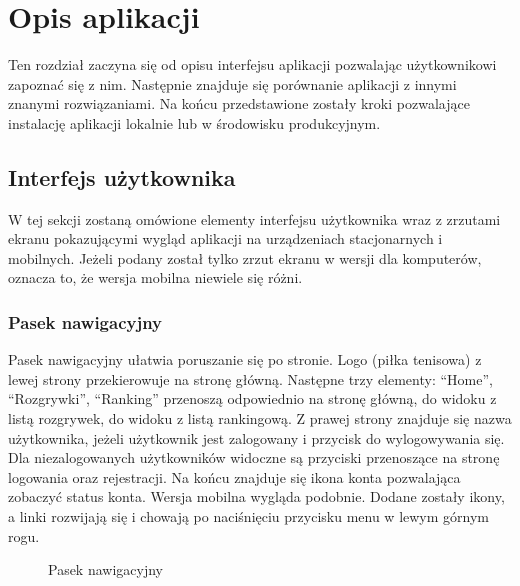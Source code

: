 \documentclass[shortabstract]{iithesis}
\begin{document}
\chapter{Opis aplikacji}
Ten rozdział zaczyna się od opisu interfejsu aplikacji pozwalając użytkownikowi zapoznać się z nim.
Następnie znajduje się porównanie aplikacji z innymi znanymi rozwiązaniami.
Na końcu przedstawione zostały kroki pozwalające instalację aplikacji lokalnie lub w środowisku produkcyjnym.
\section{Interfejs użytkownika}
W tej sekcji zostaną omówione elementy interfejsu użytkownika wraz z zrzutami ekranu pokazującymi wygląd aplikacji na urządzeniach stacjonarnych i mobilnych.
Jeżeli podany został tylko zrzut ekranu w wersji dla komputerów, oznacza to, że wersja mobilna niewiele się różni.
\subsection{Pasek nawigacyjny}
Pasek nawigacyjny ułatwia poruszanie się po stronie. Logo (piłka tenisowa) z lewej strony przekierowuje na stronę główną.
Następne trzy elementy: ``Home'', ``Rozgrywki'', ``Ranking'' przenoszą odpowiednio na stronę główną, do widoku z listą rozgrywek, do widoku z listą rankingową.
Z prawej strony znajduje się nazwa użytkownika, jeżeli użytkownik jest zalogowany i przycisk do wylogowywania się.
Dla niezalogowanych użytkowników widoczne są przyciski przenoszące na stronę logowania oraz rejestracji.
Na końcu znajduje się ikona konta pozwalająca zobaczyć status konta. Wersja mobilna wygląda podobnie. 
Dodane zostały ikony, a linki rozwijają się i chowają po naciśnięciu przycisku menu w lewym górnym rogu.

\begin{figure}[H]
    \centering
    \hfill
    \caption{Pasek nawigacyjny}
\end{figure}
\end{document}
